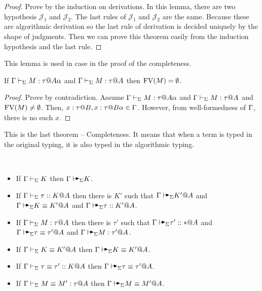 \begin{proof}
    Prove by the induction on derivations.  In this lemma, there are two
    hypothesis \( \mathcal{J}_1 \) and \( \mathcal{J}_2 \).  The last rules of
    \( \mathcal{J}_1 \) and \( \mathcal{J}_2 \) are the same.  Because these
    are algorithmic derivation so the last rule of derivation is decided
    uniquely by the shape of judgments.  Then we can prove this theorem easily
    from the induction hypothesis and the last rule.
\end{proof}

This lemma is used in \QPercent case in the proof of the completeness.

\begin{lemma}
    \label{lemma:FreeVariableandStage}
    If \( \G\V M:\tau@{A\alpha} \) and \( \Gamma\vdash_\Sigma M:\tau @A \) then \( \text{FV}(M) = \emptyset \).
\end{lemma}

\begin{proof}
    Prove by contradiction. Assume \( \G\V M:\tau@{A\alpha} \) and \({ \Gamma\vdash_\Sigma
    M:\tau @A }\) and \( \text{FV}(M) \neq \emptyset \). Then, \( x : \tau @ B, x:
    \tau @ B\alpha \in \Gamma \). However, from well-formedness of \( \Gamma \), there
    is no such \( x \).
\end{proof}

This is the last theorem -- Completeness. It means that when a term is typed in
the original typing, it is also typed in the algorithmic typing.

\begin{theorem}\
    \label{theorem:CompletenessofAlgorithmicTyping}
    \begin{itemize}
        \item If \(\Gamma\vdash_\Sigma K \) then \(\G\AVS K \).
        \item If \(\Gamma\vdash_\Sigma \tau ::K @ A \) then there is \(K'\) such that \( \G \AVS K' @ A \) and \({ \G \AVS K\E K' @ A }\) and \({ \G\AVS \tau :: K' @ A }\).
        \item If \(\Gamma\vdash_\Sigma M:\tau @ A \) then there is \(\tau'\) such that \({ \G \AVS \tau' :: * @ A }\) and \({ \G \AVS \tau \E \tau' @ A }\) and \({ \G\AVS M:\tau' @ A }\).
        \item If \(\Gamma\vdash_\Sigma K\equiv K' @ A \) then \(\G\AVS K\E K' @ A \).
        \item If \(\Gamma\vdash_\Sigma \tau \equiv \tau' :: K @ A \) then \(\G\AVS \tau \E \tau' @ A \).
        \item If \(\Gamma\vdash_\Sigma M\equiv M' : \tau @ A \) then \(\G \AVS M \E M' @ A \).
    \end{itemize}
\end{theorem}

